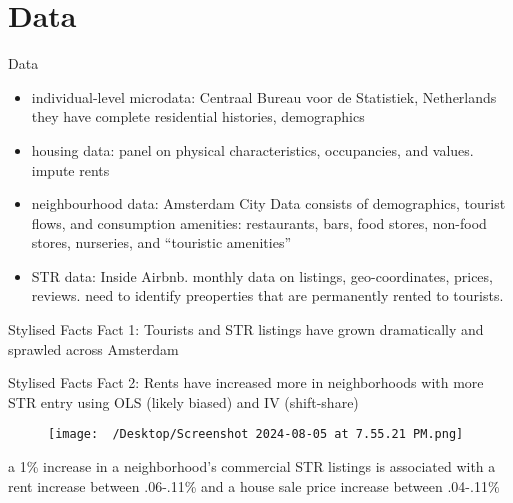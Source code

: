 \section{Data}
\begin{frame}{Data}
	\begin{itemize}
		\item individual-level microdata: Centraal Bureau voor de Statistiek, Netherlands
        they have complete residential histories, demographics
        \item housing data: panel on physical characteristics, occupancies, and values. impute rents 
        \item neighbourhood data: Amsterdam City Data consists of demographics, tourist flows, and consumption
        amenities: restaurants, bars, food stores, non-food stores, nurseries, and “touristic amenities”
        \item STR data: Inside Airbnb. monthly data on listings, geo-coordinates, prices, reviews.
        need to identify preoperties that are permanently rented to tourists.  
	\end{itemize}
\end{frame}


\begin{frame}{Stylised Facts}
    Fact 1: Tourists and STR listings have grown dramatically and sprawled across Amsterdam
    \begin{figure}
        \centering 
        \caption{}
        \label{fig:photo}
    \end{figure}
\end{frame}

\begin{frame}{Stylised Facts}
    Fact 2: Rents have increased more in neighborhoods with more STR entry
    using OLS (likely biased) and IV (shift-share)
    \begin{figure}
        \centering 
        \texttt{[image: ~/Desktop/Screenshot 2024-08-05 at 7.55.21 PM.png]}
        \caption{}
        \label{fig:photo}
    \end{figure}
    a 1\% increase in a neighborhood’s commercial STR listings is associated with a rent increase between .06-.11\%
    and a house sale price increase between .04-.11\%
\end{frame}

